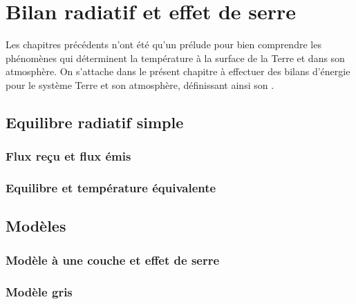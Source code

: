 \chapter{Bilan radiatif et effet de serre}


\bk Les chapitres précédents n'ont été qu'un prélude pour bien comprendre les phénomènes qui déterminent la température à la surface de la Terre et dans son atmosphère. On s'attache dans le présent chapitre à effectuer des bilans d'énergie pour le système Terre et son atmosphère, définissant ainsi son .

\mk \section{Equilibre radiatif simple}

	\sk \subsection{Flux reçu et flux émis}

		

	\sk \subsection{Equilibre et température équivalente}

		
		

\mk \section{Modèles } %

	\sk \subsection{Modèle à une couche et effet de serre}

		
		
		

	\sk \subsection{Modèle gris}

